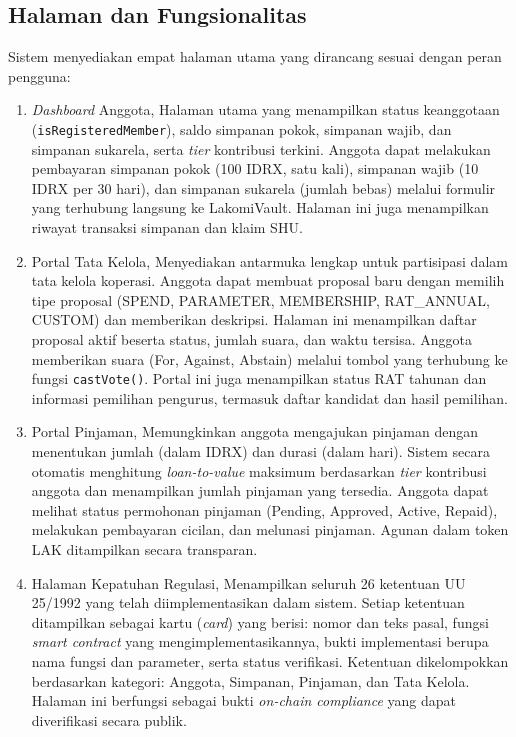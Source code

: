 \subsection{Halaman dan Fungsionalitas}

Sistem menyediakan empat halaman utama yang dirancang sesuai dengan peran pengguna:

\begin{enumerate}
	\item \textit{Dashboard} Anggota, Halaman utama yang menampilkan status keanggotaan (\texttt{isRegisteredMember}), saldo simpanan pokok, simpanan wajib, dan simpanan sukarela, serta \textit{tier} kontribusi terkini. Anggota dapat melakukan pembayaran simpanan pokok (100 IDRX, satu kali), simpanan wajib (10 IDRX per 30 hari), dan simpanan sukarela (jumlah bebas) melalui formulir yang terhubung langsung ke LakomiVault. Halaman ini juga menampilkan riwayat transaksi simpanan dan klaim SHU.
	
	\item Portal Tata Kelola, Menyediakan antarmuka lengkap untuk partisipasi dalam tata kelola koperasi. Anggota dapat membuat proposal baru dengan memilih tipe proposal (SPEND, PARAMETER, MEMBERSHIP, RAT\_ANNUAL, CUSTOM) dan memberikan deskripsi. Halaman ini menampilkan daftar proposal aktif beserta status, jumlah suara, dan waktu tersisa. Anggota memberikan suara (For, Against, Abstain) melalui tombol yang terhubung ke fungsi \texttt{castVote()}. Portal ini juga menampilkan status RAT tahunan dan informasi pemilihan pengurus, termasuk daftar kandidat dan hasil pemilihan.
	
	\item Portal Pinjaman, Memungkinkan anggota mengajukan pinjaman dengan menentukan jumlah (dalam IDRX) dan durasi (dalam hari). Sistem secara otomatis menghitung \textit{loan-to-value} maksimum berdasarkan \textit{tier} kontribusi anggota dan menampilkan jumlah pinjaman yang tersedia. Anggota dapat melihat status permohonan pinjaman (Pending, Approved, Active, Repaid), melakukan pembayaran cicilan, dan melunasi pinjaman. Agunan dalam token LAK ditampilkan secara transparan.
	
	\item Halaman Kepatuhan Regulasi, Menampilkan seluruh 26 ketentuan UU 25/1992 yang telah diimplementasikan dalam sistem. Setiap ketentuan ditampilkan sebagai kartu (\textit{card}) yang berisi: nomor dan teks pasal, fungsi \textit{smart contract} yang mengimplementasikannya, bukti implementasi berupa nama fungsi dan parameter, serta status verifikasi. Ketentuan dikelompokkan berdasarkan kategori: Anggota, Simpanan, Pinjaman, dan Tata Kelola. Halaman ini berfungsi sebagai bukti \textit{on-chain compliance} yang dapat diverifikasi secara publik.
\end{enumerate}

